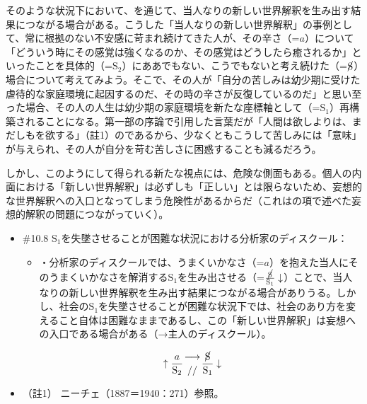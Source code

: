 そのような状況下において、を通じて、当人なりの新しい世界解釈を生み出す結果につながる場合がある。こうした「当人なりの新しい世界解釈」の事例として、常に根拠のない不安感に苛まれ続けてきた人が、その辛さ（=\(a\)）について「どういう時にその感覚は強くなるのか、その感覚はどうしたら癒されるか」といったことを具体的（=\(\textrm{S}_2\)）にああでもない、こうでもないと考え続けた（=\(\cancel{\textrm{S}}\)）場合について考えてみよう。そこで、その人が「自分の苦しみは幼少期に受けた虐待的な家庭環境に起因するのだ、その時の辛さが反復しているのだ」と思い至った場合、その人の人生は幼少期の家庭環境を新たな座標軸として（=\(\textrm{S}_1\)）再構築されることになる。第一部の序論で引用した言葉だが「人間は欲しよりは、まだしもを欲する」（註1）のであるから、少なくともこうして苦しみには「意味」が与えられ、その人が自分を苛む苦しさに困惑することも減るだろう。

しかし、このようにして得られる新たな視点には、危険な側面もある。個人の内面における「新しい世界解釈」は必ずしも「正しい」とは限らないため、妄想的な世界解釈への入口となってしまう危険性があるからだ（これはの項で述べた妄想的解釈の問題につながっていく）。

\begin{note}{}
  \begin{itemize}
    \tightlist
    \item{\#10.8} $\textrm{S}_1$を失墜させることが困難な状況における分析家のディスクール：
      \begin{itemize}
        \tightlist
        \item ・分析家のディスクールでは、うまくいかなさ（=$a$）を抱えた当人にそのうまくいかなさを解消する$\textrm{S}_1$を生み出させる（=$\frac{\cancel{\textrm{S}}}{\textrm{S}_1}\downarrow$）ことで、当人なりの新しい世界解釈を生み出す結果につながる場合がありうる。しかし、社会の$\textrm{S}_1$を失墜させることが困難な状況下では、社会のあり方を変えること自体は困難なままであるし、この「新しい世界解釈」は妄想への入口である場合がある（→主人のディスクール）。
      \end{itemize}

$$
\uparrow\frac{a}{\mathrm{S_2}}\genfrac{}{}{0pt}{}{\longrightarrow}{//}\frac{\cancel{\textrm{S}}}{\mathrm{S_1}}\downarrow
$$
  \end{itemize}
\end{note}

\begin{itemize}
\tightlist
\item
  （註1） ニーチェ（1887＝1940：271）\cite{Nietzsche2}参照。
\end{itemize}

